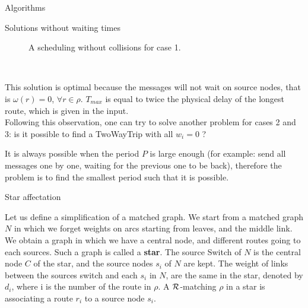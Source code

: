 \documentclass[a4paper,10pt]{report}
\begin{document}
\begin{chapter}{Algorithms}
\begin{section}{Solutions without waiting times}
\begin{center}
{{\begin{figure}[H]
\begin{center}
{
 }
  \caption{A scheduling without collisions for case 1.}
 
\end{center}
\end{figure}
}}\\
\end{center}
 
This solution is optimal because the messages will not wait on source nodes, that is $\omega(r) = 0$, $\forall r \in \rho$. $T_{max}$ is
equal to twice the physical delay of the longest route, which is given in the input.\\


Following this observation, one can try to solve another problem for cases 2 and 3: is it possible to find a TwoWayTrip
with all $w_i = 0$ ? 

It is always possible when the period $P$ is large enough (for example: send all messages one by one, waiting for the previous one to be back),
therefore the problem is to find the smallest period such that it is possible.

\begin{subsection}{Star affectation}
 
Let us define a simplification of a matched graph. 
We start from a matched graph $N$ in which we forget weights on arcs starting from leaves, and the middle link.
We obtain a graph in which we have a central node, and different routes going to each sources.
Such a graph is called a {\bf star}.
The source Switch of $N$ is the central node $C$ of the star, and the source nodes $s_i$ of $N$ are kept. 
The weight of links between the sources switch and each $s_i$ in $N$, are the same in the star, denoted by $d_i$, where i is the number of the route in $\rho$. 
A ${\cal R}$-matching $\rho$ in a star is associating a route $r_i$ to a source node $s_i$.\\


\end{subsection}
\end{section}
\end{chapter}
\end{document}
